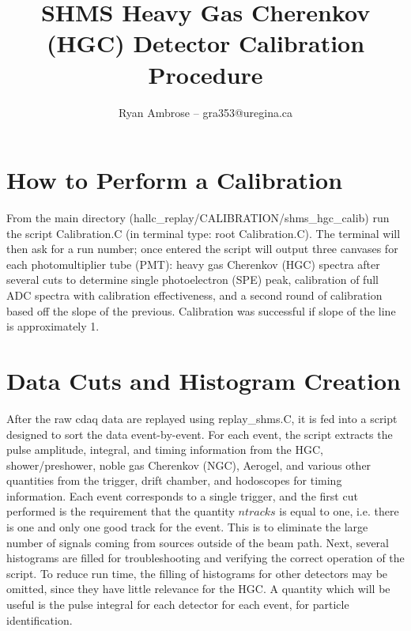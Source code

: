 \documentclass[12pt,letterpaper]{article}
\begin{document}
\title{SHMS Heavy Gas Cherenkov (HGC) Detector Calibration Procedure}
\author{Ryan Ambrose -- gra353@uregina.ca}
\date{}
\maketitle

\section{How to Perform a Calibration}
From the main directory (hallc\_replay/CALIBRATION/shms\_hgc\_calib) run the script Calibration.C (in terminal type: root Calibration.C). The terminal will then ask for a run number; once entered the script will output three canvases for each photomultiplier tube (PMT): heavy gas Cherenkov (HGC) spectra after several cuts to determine single photoelectron (SPE) peak, calibration of full ADC spectra with calibration effectiveness, and a second round of calibration based off the slope of the previous. Calibration was successful if slope of the line is approximately 1.

\section{Data Cuts and Histogram Creation}

After the raw cdaq data are replayed using replay\_shms.C, it is fed into a script designed to sort the data event-by-event. For each event, the script extracts the pulse amplitude, integral, and timing information from the HGC, shower/preshower, noble gas Cherenkov (NGC), Aerogel, and various other quantities from the trigger, drift chamber, and hodoscopes for timing information. Each event corresponds to a single trigger, and the first cut performed is the requirement that the quantity $ntracks$ is equal to one, i.e. there is one and only one good track for the event. This is to eliminate the large number of signals coming from sources outside of the beam path. Next, several histograms are filled for troubleshooting and verifying the correct operation of the script. To reduce run time, the filling of histograms for other detectors may be omitted, since they have little relevance for the HGC. A quantity which will be useful is the pulse integral for each detector for each event, for particle identification. \\
\end{document}

